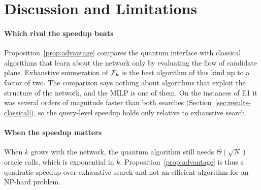 \section{Discussion and Limitations}\label{sec:discussion}

\paragraph{Which rival the speedup beats} Proposition~\ref{prop:advantage} compares the quantum interface with classical algorithms that learn about the network only by evaluating the flow of candidate plans. Exhaustive enumeration of $\mathcal{F}_k$ is the best algorithm of this kind up to a factor of two. The comparison says nothing about algorithms that exploit the structure of the network, and the MILP is one of them. On the instances of E1 it was several orders of magnitude faster than both searches (Section~\ref{sec:results-classical}), so the query-level speedup holds only relative to exhaustive search.

\paragraph{When the speedup matters} When $k$ grows with the network, the quantum algorithm still needs $\Theta(\sqrt{N})$ oracle calls, which is exponential in $k$. Proposition~\ref{prop:advantage} is thus a quadratic speedup over exhaustive search and not an efficient algorithm for an NP-hard problem.

